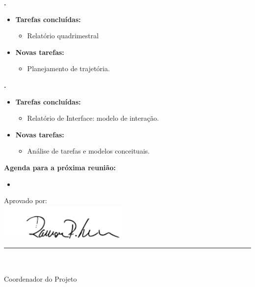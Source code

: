   \textbf{\elael.} 
	\begin{itemize}
		\item \textbf{Tarefas concluídas:}
			\begin{itemize}    
				\item Relatório quadrimestral
			\end{itemize}
		
		\item \textbf{Novas tarefas:}
			\begin{itemize} 
				\item Planejamento de trajetória.
			\end{itemize}
	\end{itemize}	
			
   \textbf{\julia.} 
	\begin{itemize}
		\item \textbf{Tarefas concluídas:}
			\begin{itemize}    
				\item Relatório de Interface: modelo de interação.
			\end{itemize}
		
		\item \textbf{Novas tarefas:}
			\begin{itemize} 
			    \item Análise de tarefas e modelos conceituais.
			\end{itemize}
	\end{itemize}		



\textbf{Agenda para a próxima reunião:}
  \begin{itemize}
    \item   
  \end{itemize}


\vspace{5mm}%
\parbox[t]{70mm}{
  Aprovado por: \\[5mm]
  \centering
  \includegraphics[width=65mm]{figs/logo/assinatura-ramon.png} \\[-4mm]
  \rule[2mm]{70mm}{0.1mm} \\
  \ramon \\[1mm]
  Coordenador do Projeto \\
}

\fim